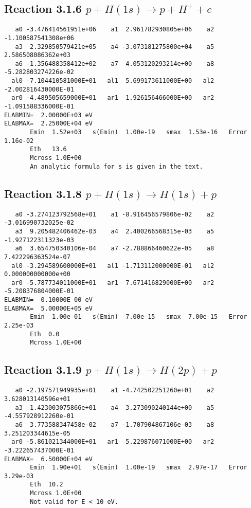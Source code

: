 \documentclass[12pt,dvipdfmx]{article}
\begin{document}
\newpage
\subsection{
Reaction 3.1.6 $   p + H(1s) \rightarrow p + H^+ + e$}


\begin{small}\begin{verbatim}
   a0 -3.476414561951e+06    a1  2.961782930805e+06    a2 -1.100587541308e+06
   a3  2.329850579421e+05    a4 -3.073181275800e+04    a5  2.586508086362e+03
   a6 -1.356488358412e+02    a7  4.053120293214e+00    a8 -5.282803274226e-02
  al0 -7.104410581000E+01   al1  5.699173611000E+00   al2 -2.002816430000E-01
  ar0 -4.489505659000E+01   ar1  1.926156466000E+00   ar2 -1.091588336000E-01
ELABMIN=  2.00000E+03 eV
ELABMAX=  2.25000E+04 eV
       Emin  1.52e+03   s(Emin)  1.00e-19   smax  1.53e-16   Error  1.16e-02
       Eth   13.6
       Mcross 1.0E+00
       An analytic formula for s is given in the text.
\end{verbatim}\end{small}






\newpage
\subsection{
Reaction 3.1.8 $   p + H(1s) \rightarrow H(1s) + p$}


\begin{small}\begin{verbatim}
   a0 -3.274123792568e+01    a1 -8.916456579806e-02    a2 -3.016990732025e-02
   a3  9.205482406462e-03    a4  2.400266568315e-03    a5 -1.927122311323e-03
   a6  3.654750340106e-04    a7 -2.788866460622e-05    a8  7.422296363524e-07
  al0 -3.294589600000E+01   al1 -1.713112000000E-01   al2  0.000000000000e+00
  ar0 -5.787734011000E+01   ar1  7.671416829000E+00   ar2 -5.208376804000E-01
ELABMIN=  0.10000E 00 eV
ELABMAX=  5.00000E+05 eV
       Emin  1.00e-01   s(Emin)  7.00e-15   smax  7.00e-15   Error  2.25e-03
       Eth  0.0
       Mcross 1.0E+00
\end{verbatim}\end{small}

\newpage
\subsection{
Reaction 3.1.9 $   p + H(1s) \rightarrow H(2p) + p$}


\begin{small}\begin{verbatim}
   a0 -2.197571949935e+01    a1 -4.742502251260e+01    a2  3.628013140596e+01
   a3 -1.423003075866e+01    a4  3.273090240144e+00    a5 -4.557928912260e-01
   a6  3.773588347458e-02    a7 -1.707904867106e-03    a8  3.251203344615e-05
  ar0 -5.861021344000E+01   ar1  5.229876071000E+00   ar2 -3.222657437000E-01
ELABMAX=  6.50000E+04 eV
       Emin  1.90e+01   s(Emin)  1.00e-19   smax  2.97e-17   Error  3.29e-03
       Eth  10.2
       Mcross 1.0E+00
       Not valid for E < 10 eV.
\end{verbatim}\end{small}
\end{document}
